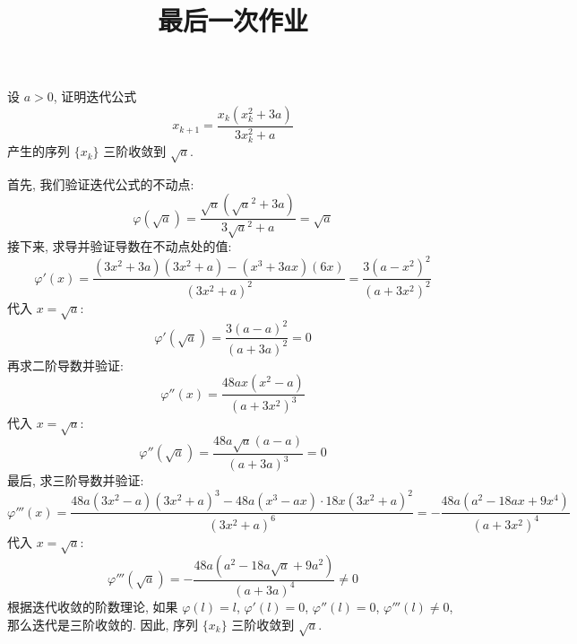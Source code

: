 \documentclass[lang = zh]{iwork}
\title{最后一次作业}
\begin{document}
\maketitle

\begin{prob}
  设 $a > 0$, 证明迭代公式
  \begin{equation*}
    x_{k + 1} = \frac{x_k (x_k^2 + 3 a)}{3 x_k^2 + a}
  \end{equation*}
  产生的序列 $\{x_k\}$ 三阶收敛到 $\sqrt{a}$.

\end{prob}
\begin{sol}
  首先, 我们验证迭代公式的不动点:
  \begin{equation*}
    \varphi(\sqrt{a})
    = \frac{\sqrt{a} (\sqrt{a}^2 + 3 a)}{3 \sqrt{a}^2 + a}
    = \sqrt{a}
  \end{equation*}
  接下来, 求导并验证导数在不动点处的值:
  \begin{equation*}
    \varphi'(x)
    = \frac{(3 x^2 + 3 a) (3 x^2 + a) - (x^3 + 3 a x) (6 x)}{(3 x^2 + a)^2}
    = \frac{3 (a - x^2)^2}{(a + 3 x^2)^2}
  \end{equation*}
  代入 $x = \sqrt{a}$:
  \begin{equation*}
    \varphi'(\sqrt{a})
    = \frac{3 (a - a)^2}{(a + 3 a)^2}
    = 0
  \end{equation*}
  再求二阶导数并验证:
  \begin{equation*}
    \varphi''(x) = \frac{48 a x (x^2 - a)}{(a + 3 x^2)^3}
  \end{equation*}
  代入 $x = \sqrt{a}$:
  \begin{equation*}
    \varphi''(\sqrt{a}) = \frac{48 a \sqrt{a} (a - a)}{(a + 3 a)^3} = 0
  \end{equation*}
  最后, 求三阶导数并验证:
  \begin{equation*}
    \varphi'''(x)
    = \frac{48a(3x^2 - a)(3x^2 + a)^3 - 48a(x^3 - a x) \cdot 18x(3x^2 + a)^2}{(3x^2 + a)^6}
    = - \frac{48 a (a^2 - 18 a x + 9 x^4)}{(a + 3 x^2)^4}
  \end{equation*}
  代入 $x = \sqrt{a}$:
  \begin{equation*}
    \varphi'''(\sqrt{a})
    = - \frac{48 a (a^2 - 18 a \sqrt{a} + 9 a^2)}{(a + 3 a)^4}
    \neq 0
  \end{equation*}
  根据迭代收敛的阶数理论, 如果 $\varphi(l) = l$, $\varphi'(l) = 0$, $\varphi''(l) = 0$, $\varphi'''(l) \neq 0$, 那么迭代是三阶收敛的.
  因此, 序列 $\{x_k\}$ 三阶收敛到 $\sqrt{a}$.
\end{sol}
\end{document}
